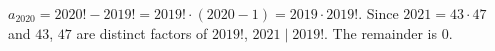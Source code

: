 $a_{2020}=2020!-2019!=2019!\cdot(2020-1)=2019\cdot2019!$. Since $2021=43\cdot47$ and $43$, $47$ are distinct factors of $2019!$, $2021\mid2019!$. The remainder is $\boxed{0}$.
